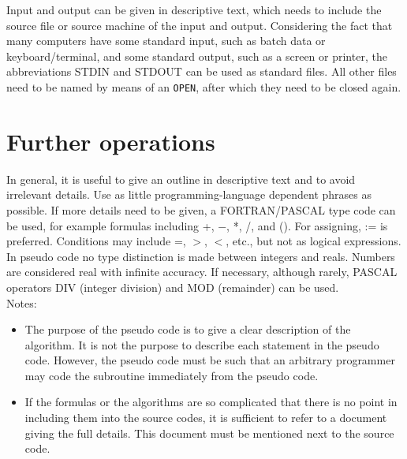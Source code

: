 \documentclass[12pt]{book}
\begin{document}
Input and output can be given in descriptive text, which needs to include the source file or
source machine of the input and output. Considering the fact that many computers have some standard
input, such as batch data or keyboard/terminal, and some standard output, such as a screen or printer,
the abbreviations STDIN and STDOUT can be used as standard files. All other files need to be named by
means of an {\tt OPEN}, after which they need to be closed again.

\section{Further operations}

In general, it is useful to give an outline in descriptive text and to avoid irrelevant details.
Use as little programming-language dependent phrases as possible. If more details need to be given,
a FORTRAN/PASCAL type code can be used, for example formulas including +, $-$,  *, /, and (). For
assigning, := is preferred. Conditions may include =, $>$, $<$, etc., but not as logical expressions.
\\[2ex]
\noindent
In pseudo code no type distinction is made between integers and reals. Numbers are considered
real with infinite accuracy. If necessary, although rarely,
PASCAL operators DIV (integer division) and MOD (remainder) can be used.
\\[2ex]
\noindent
Notes:
\begin{itemize}
  \item The purpose of the pseudo code is to give a clear description of the algorithm. It is not
        the purpose to describe each statement in the pseudo code. However, the pseudo code must be
        such that an arbitrary programmer may code the subroutine immediately from the pseudo code.
  \item If the formulas or the algorithms are so complicated that there is no point in including them
        into the source codes, it is sufficient to refer to a document giving the full details.
        This document must be mentioned next to the source code.
\end{itemize}

 \label{ch:optim}
\end{document}

